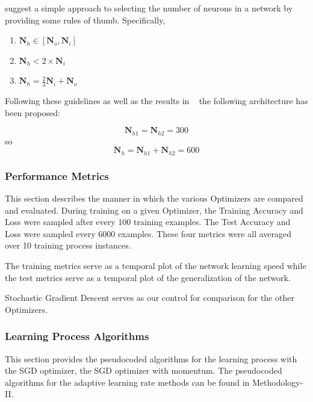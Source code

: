 \documentclass{article}
\begin{document}
 \citet{panchal2014review} suggest a simple approach to selecting the number of neurons in a network by providing some rules of thumb. Specifically,
\begin{enumerate}
	\item	$\boldsymbol{N}_h\in[\boldsymbol{N}_o, \boldsymbol{N}_i]$
	
	\item$\boldsymbol{N}_h < 2\times\boldsymbol{N}_i$
	
	\item$\boldsymbol{N}_h = \frac{2}{3}\boldsymbol{N}_i + \boldsymbol{N}_o$
\end{enumerate}
 
 Following these guidelines as well as the results in ~\cite{deepsimpleMLP} the following architecture has been proposed:
 
 \begin{equation}
 	\boldsymbol{N}_{h1} = \boldsymbol{N}_{h2} = 300
 \end{equation}
so \begin{equation}
\boldsymbol{N}_h = \boldsymbol{N}_{h1} + \boldsymbol{N}_{h2} = 600
\end{equation}
\subsubsection{Performance Metrics}
This section describes the manner in which the various Optimizers are compared and evaluated.
\hfill\newline
During training on a given Optimizer, the Training Accuracy and Loss were sampled after every 100 training examples. The Test Accuracy and Loss were sampled every 6000 examples. These four metrics were all averaged over 10 training process instances. 

The training metrics serve as a temporal plot of the network learning speed while the test metrics serve as a temporal plot of the generalization of the network.

Stochastic Gradient Descent serves as our control for comparison for the other Optimizers.

\subsubsection{Learning Process Algorithms}
This section provides the pseudocoded algorithms for the learning process with the SGD optimizer, the SGD optimizer with momentum. The pseudocoded algorithms for the adaptive learning rate methods can be found in Methodology-II.
\end{document}
